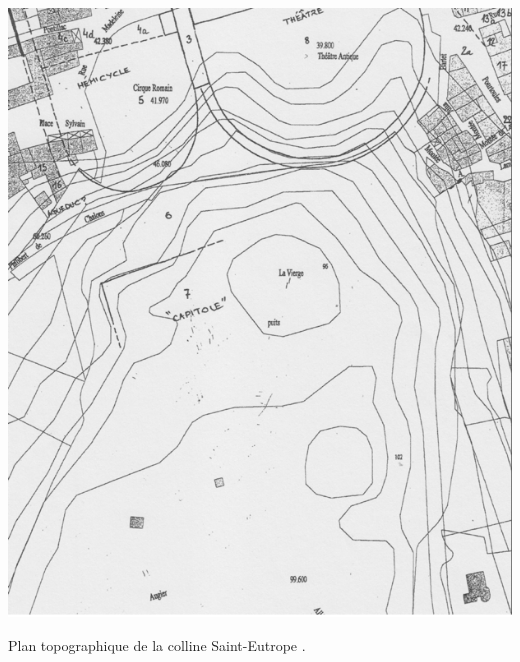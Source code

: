 \begin{figureth}
	\includegraphics[width=\linewidth]{images/colline}
	\caption[Plan topographique de la colline Saint-Eutrope.]{Plan topographique de la colline Saint-Eutrope \footnotemark.}
	\label{colline} 
\end{figureth}	
\newpage

